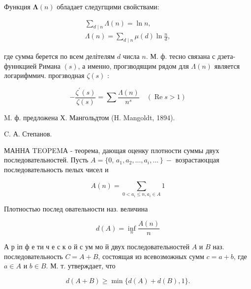 \documentclass[10pt]{article}
\begin{document}
Функция $\boldsymbol{\Lambda}(n)$ обладает следугщими свойствами:



\[

\begin{gathered}

\sum_{d \mid n} \Lambda(n)=\ln n, \\

\Lambda(n)=\sum_{d \mid n} \mu(d) \ln \frac{n}{d},

\end{gathered}

\]



где сумма берется по всем делітелям $d$ числа $n$. М. ф. тесно связана с дзета-фуннкцией Римана $(s)$, а именно, прогзводящим рядом для $\Lambda(n)$ является логарифммич. прогзводная $\zeta(s)$ :



\[

-\frac{\zeta^{\prime}(s)}{\zeta(s)}=\sum \frac{\Lambda(n)}{n^{s}} \quad(\operatorname{Re} s>1)

\]



M. ф. предложена Х. Мангольдтом (H. Mangoldt, 1894).



C. А. Степанов.



МАННА TEOPEMА - теорема, дающая оценку плотности суммы двух последовательностей. Пусть $A=\{0$, $\left.a_{1}, a_{2}, \ldots, a_{i}, \ldots\right\}-$ возрастаюццая последовательность пелых чисел и



\[

A(n)=\sum_{0<a_{i} \leqslant n, a_{i} \in A} 1

\]



Плотностью послед овательности наз. величина



\[

d(A)=\inf _{n} \frac{A(n)}{n}

\]



А р іп ф е ти ч е с к о й с ум мо й двух последовательностей $A$ и $B$ наз. последовательность $C=A+B$, состоящая из всевозможных сумм $c=a+b$, где $a \in A$ и $b \in B$. М. т. утверждает, что



\[

d(A+B) \geqslant \min \{d(A)+d(B), 1\} .

\]
\end{document}
